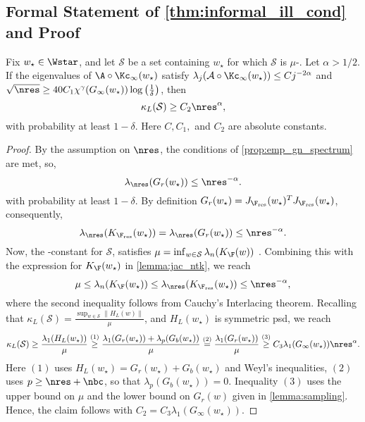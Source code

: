 \subsection{Formal Statement of \cref{thm:informal_ill_cond} and Proof}
\begin{theorem}
    Fix $w_\star \in \Wstar$, and let $\mathcal S$ be a set containing $w_\star$ for which $\mathcal S$ is $\mu$-\PL.
    Let $\alpha>1/2$.
    If the eigenvalues of $\A\circ \Kc_{\infty}(w_\star)$ satisfy $\lambda_j(\mathcal A\circ \Kc_{\infty}(w_\star))\leq C j^{-2\alpha}$ and $\sqrt{\nres}\geq 40 C_1\chi^{\gamma}(G_{\infty}(w_\star))\log\left(\frac{1}{\delta}\right)$, then 
    \[
            \kappa_L(\mathcal S) \geq C_2\nres^{\alpha},
    \]
    with probability at least $1-\delta$.
    Here $C, C_1,$ and $C_2$ are absolute constants. 
        
\end{theorem}

\begin{proof}
    By the assumption on $\nres$, the conditions of \cref{prop:emp_gn_spectrum} are met, so, 
    \[
    \lambda_{\nres}(G_r(w_\star))\leq \nres^{-\alpha}.
    \] 
    with probability at least $1-\delta$.
    By definition $G_r(w_\star) = J_{\F_{\textup{res}}}(w_\star)^{T}J_{\F_{\textup{res}}}(w_\star)$, consequently,
    \[
    \lambda_{\nres}(K_{\F_{\textup{res}}}(w_\star)) = \lambda_{\nres}(G_r(w_\star)) \leq \nres^{-\alpha}.
    \] 
    Now, the \PL-constant for $\mathcal S$, satisfies $\mu = \inf_{w \in \mathcal S}\lambda_{n}(K_{\F}(w))$ \cite{liu2022loss}. 
    Combining this with the expression for $K_\F(w_\star)$ in \cref{lemma:jac_ntk}, we reach 
    \[
    \mu\leq \lambda_n(K_\F(w_\star))\leq \lambda_{\nres}(K_{\F_{\textup{res}}}(w_\star))\leq \nres^{-\alpha},
    \]
    where the second inequality follows from Cauchy's Interlacing theorem. 
    Recalling that $\kappa_L(\mathcal S) = \frac{\sup_{w \in \mathcal S}\|H_L(w)\|}{\mu}$, and $H_L(w_\star)$ is symmetric psd, we reach
    \begin{align*}
        \kappa_L(\mathcal S) \geq \frac{\lambda_1(H_L(w_\star))}{\mu}\overset{(1)}{\geq} \frac{\lambda_1(G_r(w_\star))+\lambda_p(G_b(w_\star))}{\mu} \overset{(2)}{=} \frac{\lambda_1(G_r(w_\star))}{\mu} \overset{(3)}{\geq} C_3\lambda_1(G_\infty(w_\star))\nres^{\alpha}. 
    \end{align*}
    Here $(1)$ uses $H_L(w_\star) = G_r(w_\star)+G_b(w_\star)$ and Weyl's inequalities, $(2)$ uses $p\geq \nres+\nbc$, so that $\lambda_p(G_b(w_\star)) = 0$.
    Inequality $(3)$ uses the upper bound on $\mu$ and the lower bound on $G_r(w)$ given in \cref{lemma:sampling}. 
    Hence, the claim follows with $C_2 = C_3\lambda_1(G_\infty(w_\star))$.
\end{proof}
